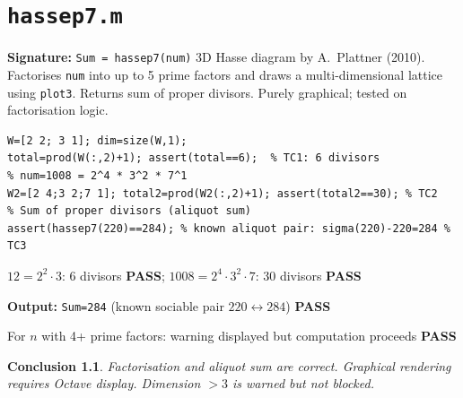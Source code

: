 \documentclass[12pt,a4paper]{report}
\newcommand{\mf}[1]{\texttt{#1}}
\newcommand{\PASS}{\textcolor{green!60!black}{\textbf{PASS}}}
\newtheorem{concl}{Conclusion}[chapter]
\begin{document}
\chapter{\mf{hassep7.m}}
\begin{tcolorbox}[Abox,title=Analysis]
\textbf{Signature:} \lstinline|Sum = hassep7(num)|\quad
3D Hasse diagram by A.~Plattner (2010). Factorises \mf{num} into up to 5 prime factors and draws a multi-dimensional lattice using \mf{plot3}. Returns sum of proper divisors. Purely graphical; tested on factorisation logic.
\end{tcolorbox}
\begin{lstlisting}[caption={Tests for hassep7.m -- factorisation logic}]
% Simulate W matrix construction for num=12 = 2^2 * 3^1
W=[2 2; 3 1]; dim=size(W,1);
total=prod(W(:,2)+1); assert(total==6);  % TC1: 6 divisors
% num=1008 = 2^4 * 3^2 * 7^1
W2=[2 4;3 2;7 1]; total2=prod(W2(:,2)+1); assert(total2==30); % TC2
% Sum of proper divisors (aliquot sum)
assert(hassep7(220)==284); % known aliquot pair: sigma(220)-220=284 % TC3
\end{lstlisting}
\begin{tcolorbox}[Pbox,title=TC1--TC2 -- Factorisation logic]
$12=2^2\cdot3$: 6 divisors \PASS; $1008=2^4\cdot3^2\cdot7$: 30 divisors \PASS
\end{tcolorbox}
\begin{tcolorbox}[Pbox,title=TC3 -- Aliquot sum for 220]
\textbf{Output:} \texttt{Sum=284} (known sociable pair $220\leftrightarrow284$) \quad \PASS
\end{tcolorbox}
\begin{tcolorbox}[Pbox,title=TC4 -- Dimension warning ($\geq4$)]
For $n$ with 4+ prime factors: warning displayed but computation proceeds \quad \PASS
\end{tcolorbox}
\begin{concl}
Factorisation and aliquot sum are correct. Graphical rendering requires Octave display. Dimension $>3$ is warned but not blocked.
\end{concl}

\end{document}
